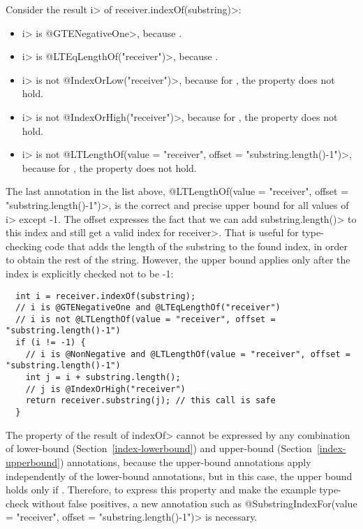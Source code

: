 Consider the result \<i> of \<receiver.indexOf(substring)>:

\begin{itemize}
\item
  \<i> is \<@GTENegativeOne>, because .
\item
  \<i> is \<@LTEqLengthOf("receiver")>, because .
\item
  \<i> is not \<@IndexOrLow("receiver")>, because for
  , the property
   does not hold.
\item
  \<i> is not \<@IndexOrHigh("receiver")>, because for
  , the property
   does not hold.
\item
  \<i> is not
  \<@LTLengthOf(value = "receiver", offset = "substring.length()-1")>,
  because for , the property
   does not hold.
\end{itemize}

\noindent
The last annotation in the list above,
\<@LTLengthOf(value = "receiver", offset = "substring.length()-1")>,
is the correct and precise upper bound for all values of \<i> except -1.
The offset expresses the fact that we can add \<substring.length()> to this
index and still get a valid index for \<receiver>.  That is useful for
type-checking code that adds the length of the substring to the found
index, in order to obtain the rest of the string.  However, the upper bound
applies only after the index is explicitly checked not to be -1:

\begin{Verbatim}
  int i = receiver.indexOf(substring);
  // i is @GTENegativeOne and @LTEqLengthOf("receiver")
  // i is not @LTLengthOf(value = "receiver", offset = "substring.length()-1")
  if (i != -1) {
    // i is @NonNegative and @LTLengthOf(value = "receiver", offset = "substring.length()-1")
    int j = i + substring.length();
    // j is @IndexOrHigh("receiver")
    return receiver.substring(j); // this call is safe
  }
\end{Verbatim}

The property of the result of \<indexOf> cannot be expressed by any
combination of lower-bound (Section~\ref{index-lowerbound}) and upper-bound
(Section~\ref{index-upperbound}) annotations, because the upper-bound
annotations apply independently of the lower-bound annotations, but in this
case, the upper bound 
holds only if .  Therefore, to express this property and make
the example type-check without false positives, a new annotation such as
\<@SubstringIndexFor\allowbreak(value = "receiver", offset = "substring.length()-1")>
is necessary.


